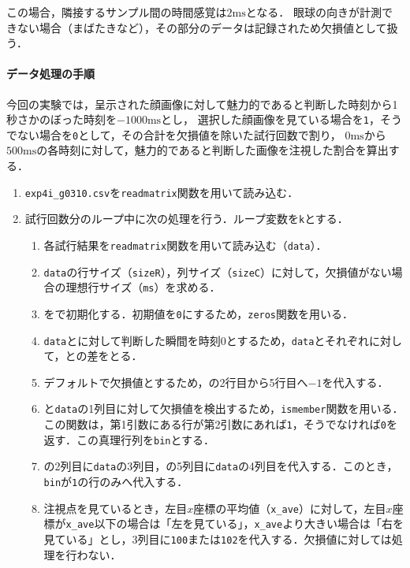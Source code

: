\noindent この場合，隣接するサンプル間の時間感覚は\(2\textrm{ms}\)となる．
眼球の向きが計測できない場合（まばたきなど），その部分のデータは記録されため欠損値として扱う．
\paragraph{データ処理の手順}
今回の実験では，呈示された顔画像に対して魅力的であると判断した時刻から1秒さかのぼった時刻を\(-1000\textrm{ms}\)とし，
選択した顔画像を見ている場合を\texttt{1}，そうでない場合を\texttt{0}として，その合計を欠損値を除いた試行回数で割り，
\(0\textrm{ms}\)から\(500\textrm{ms}\)の各時刻に対して，魅力的であると判断した画像を注視した割合を算出する．
\begin{enumerate}
    \item \texttt{exp4i\_g0310.csv}を\texttt{readmatrix}関数を用いて読み込む．
    \item 試行回数分のループ中に次の処理を行う．ループ変数を\texttt{k}とする．
          \begin{enumerate}
              \renewcommand{\theenumii}{\roman{enumii}}
              \renewcommand{\labelenumii}{\textbf{\theenumii}. }
              \newcommand{\dt}{\texttt{data}}
              \newcommand{\ms}{\texttt{ms}}
              \newcommand{\bn}{\texttt{bin}}
              \item 各試行結果を\texttt{readmatrix}関数を用いて読み込む（\dt ）．
              \item \dt の行サイズ（\texttt{sizeR}），列サイズ（\texttt{sizeC}）に対して，欠損値がない場合の理想行サイズ（\ms）を求める．
              \item \expos を\mat{\ms}{5}で初期化する．初期値を\texttt{0}にするため，\texttt{zeros}関数を用いる．
              \item \dt と\expos に対して判断した瞬間を時刻\(0\)とするため，\dt と\expos それぞれに対して，との差をとる．
              \item デフォルトで欠損値とするため，\expos の2行目から5行目へ\(-1\)を代入する．
              \item \expos と\dt の1列目に対して欠損値を検出するため，\texttt{ismember}関数を用いる．この関数は，第1引数にある行が第2引数にあれば\texttt{1}，そうでなければ\texttt{0}を返す．この真理行列を\bn とする．
              \item \expos の2列目に\dt の3列目，\expos の5列目に\dt の4列目を代入する．このとき，\bn が\texttt{1}の行のみ\expos へ代入する．
              \item 注視点を見ているとき，左目\(x\)座標の平均値（\texttt{x\_ave}）に対して，左目\(x\)座標が\texttt{x\_ave}以下の場合は「左を見ている」，\texttt{x\_ave}より大きい場合は「右を見ている」とし，\expos 3列目に\texttt{100}または\texttt{102}を代入する．欠損値に対しては処理を行わない．

\end{enumerate}
\end{enumerate}
